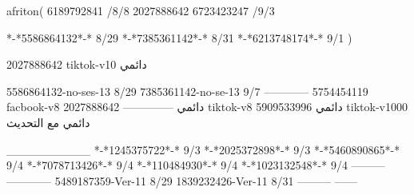 afriton(
6189792841 /8/8
2027888642
6723423247 /9/3

*-*5586864132*-* 8/29
*-*7385361142*-* 8/31
*-*6213748174*-* 9/1
)

2027888642 tiktok-v10
دائمي

5586864132-no-ses-13
8/29
7385361142-no-se-13
9/7
------------
5754454119 facbook-v8
دائمي
--------------
2027888642 tiktok-v8
دائمي
5909533996 tiktok-v1000
دائمي مع التحديث

__________
*-*1245375722*-* 9/3
*-*2025372898*-* 9/3
*-*5460890865*-* 9/4
*-*7078713426*-* 9/4
*-*110484930*-* 9/4
*-*1023132548*-* 9/4
---------
------------
5489187359-Ver-11
8/29
1839232426-Ver-11
8/31
---------
------
